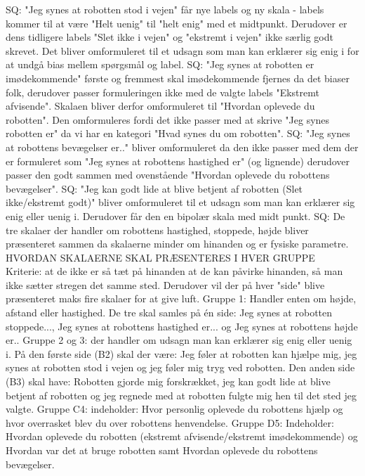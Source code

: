 %
SQ: "Jeg synes at robotten stod i vejen" får nye labels og ny skala - labels kommer til at være "Helt uenig" til "helt enig" med et midtpunkt. Derudover er dens tidligere labels "Slet ikke i vejen" og "ekstremt i vejen" ikke særlig godt skrevet. Det bliver omformuleret til et udsagn som man kan erklærer sig enig i for at undgå bias mellem spørgsmål og label.\blankline
%
SQ: "Jeg synes at robotten er imødekommende" første og fremmest skal imødekommende fjernes da det biaser folk, derudover passer formuleringen ikke med de valgte labels "Ekstremt afvisende". Skalaen bliver derfor omformuleret til "Hvordan oplevede du robotten". Den omformuleres fordi det ikke passer med at skrive "Jeg synes robotten er" da vi har en kategori "Hvad synes du om robotten". \blankline
%
SQ: "Jeg synes at robottens bevægelser er.." bliver omformuleret da den ikke passer med dem der er formuleret som "Jeg synes at robottens hastighed er" (og lignende) derudover passer den godt sammen med ovenstående "Hvordan oplevede du robottens bevægelser".\blankline
%
SQ: "Jeg kan godt lide at blive betjent af robotten (Slet ikke/ekstremt godt)" bliver omformuleret til et udsagn som man kan erklærer sig enig eller uenig i. Derudover får den en bipolær skala med midt punkt. \blankline
%
SQ: De tre skalaer der handler om robottens hastighed, stoppede, højde bliver præsenteret sammen da skalaerne minder om hinanden og er fysiske parametre. \blankline
%
HVORDAN SKALAERNE SKAL PRÆSENTERES I HVER GRUPPE\\
Kriterie: at de ikke er så tæt på hinanden at de kan påvirke hinanden, så man ikke sætter stregen det samme sted. Derudover vil der på hver "side" blive præsenteret maks fire skalaer for at give luft.\blankline 
%
Gruppe 1: Handler enten om højde, afstand eller hastighed. De tre skal samles på én side: Jeg synes at robotten stoppede..., Jeg synes at robottens hastighed er... og Jeg synes at robottens højde er..\blankline
%
Gruppe 2 og 3: der handler om udsagn man kan erklærer sig enig eller uenig i. På den første side (B2) skal der være: Jeg føler at robotten kan hjælpe mig, jeg synes at robotten stod i vejen og jeg føler mig tryg ved robotten. Den anden side (B3) skal have: Robotten gjorde mig forskrækket, jeg kan godt lide at blive betjent af robotten og jeg regnede med at robotten fulgte mig hen til det sted jeg valgte. \blankline
%
Gruppe C4: indeholder: Hvor personlig oplevede du robottens hjælp og hvor overrasket blev du over robottens henvendelse.\blankline 
%
Gruppe D5: Indeholder: Hvordan oplevede du robotten (ekstremt afvisende/ekstremt imødekommende) og Hvordan var det at bruge robotten samt Hvordan oplevede du robottens bevægelser. \blankline
